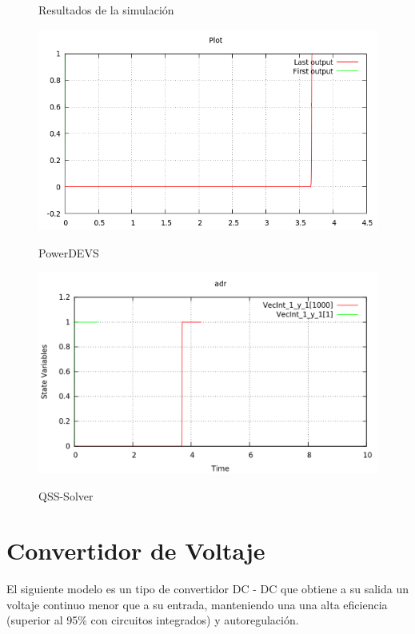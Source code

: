 \begin{figure}[H]
\centering
Resultados de la simulación \\
\begin{minipage}{0.5\textwidth}
 \includegraphics[width=\linewidth]{adr-pd}
\label{graph:adr-pd}
\caption{PowerDEVS}
\end{minipage}\hfill
\begin{minipage}{0.5\textwidth}
 \includegraphics[width=\linewidth]{adr-qss}
\label{graph:adr-qss}
\caption{QSS-Solver}
\end{minipage}
\end{figure}

\section{Convertidor de Voltaje}
	El siguiente modelo es un tipo de convertidor DC - DC que obtiene a su  salida  un  voltaje  continuo  menor  que  a  su entrada, manteniendo una una  alta eficiencia (superior al 95\% con circuitos integrados) y autoregulación.

